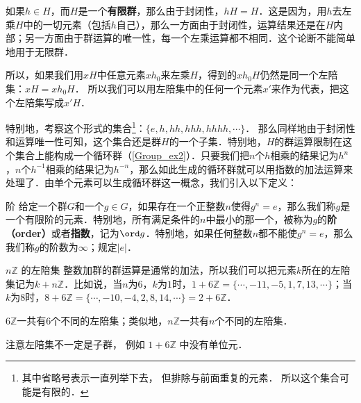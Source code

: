 如果$h\in H$，而$H$是一个\textbf{有限群}，那么由于封闭性，$hH=H$．这是因为，用$h$去左乘$H$中的一切元素（包括$h$自己），那么一方面由于封闭性，运算结果还是在$H$内部；另一方面由于群运算的唯一性，每一个左乘运算都不相同．这个论断不能简单地用于无限群．

所以，如果我们用$xH$中任意元素$xh_0$来左乘$H$，得到的$xh_0H$仍然是同一个左陪集：$xH=xh_0H$． 所以我们可以用左陪集中的任何一个元素$x'$来作为代表，把这个左陪集写成$x'H$．

特别地，考察这个形式的集合\footnote{其中省略号表示一直列举下去， 但排除与前面重复的元素． 所以这个集合可能是有限的．}：$\{e, h, hh, hhh, hhhh, \cdots\}$． 那么同样地由于封闭性和运算唯一性可知，这个集合还是群$H$的一个子集．特别地，$H$的群运算限制在这个集合上能构成一个循环群（\autoref{Group_ex2}）．只要我们把$n$个$h$相乘的结果记为$h^n$，$n$个$h^{-1}$相乘的结果记为$h^{-n}$，那么如此生成的循环群就可以用指数的加法运算来处理了．由单个元素可以生成循环群这一概念，我们引入以下定义：

\begin{definition}{阶}
给定一个群$G$和一个$g\in G$，如果存在一个正整数$n$使得$g^n=e$，那么我们称$g$是一个有限阶的元素．特别地，所有满足条件的$n$中最小的那一个，被称为$g$的\textbf{阶（order）}或者\textbf{指数}，记为$\ord g$．特别地，如果任何整数$n$都不能使$g^n=e$，那么我们称$g$的阶数为$\infty$；规定$|e|$．
\end{definition}

\begin{example}{$n\mathbb{Z}$ 的左陪集}\label{Group1_ex2}
整数加群的群运算是通常的加法，所以我们可以把元素$k$所在的左陪集记为$k+n\mathbb{Z}$．比如说，当$n$为$6$，$k$为$1$时，$1+6\mathbb{Z}=\{\cdots, -11, -5, 1, 7, 13, \cdots\}$；当$k$为$8$时，$8+6\mathbb{Z}=\{\cdots, -10, -4, 2, 8, 14, \cdots\}=2+6\mathbb{Z}$．

$6\mathbb{Z}$一共有$6$个不同的左陪集；类似地，$n\mathbb{Z}$一共有$n$个不同的左陪集．
\end{example}
注意左陪集不一定是子群， 例如 $1 + 6\mathbb Z$ 中没有单位元．

